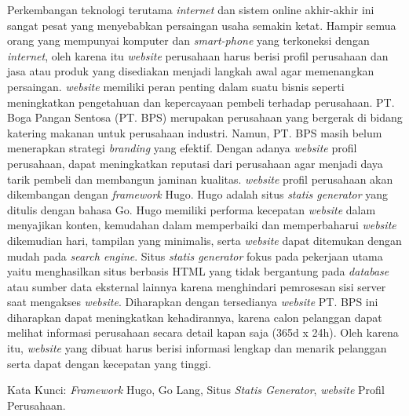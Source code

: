 
Perkembangan teknologi terutama \emph{internet} dan sistem online akhir-akhir ini sangat pesat 
yang menyebabkan persaingan usaha semakin ketat. Hampir semua orang yang mempunyai komputer 
dan \emph{smart-phone} yang terkoneksi dengan \emph{internet}, oleh karena itu \emph{website} perusahaan harus berisi 
profil perusahaan dan jasa atau produk yang disediakan menjadi langkah awal agar memenangkan persaingan. 
\emph{website} memiliki peran penting dalam suatu bisnis seperti meningkatkan pengetahuan dan kepercayaan pembeli 
terhadap perusahaan. PT. Boga Pangan Sentosa (PT. BPS) merupakan perusahaan yang bergerak di bidang katering 
makanan untuk perusahaan industri. Namun, PT. BPS masih belum menerapkan strategi \emph{branding} yang efektif. 
Dengan adanya \emph{website} profil perusahaan, dapat meningkatkan reputasi dari perusahaan agar menjadi daya tarik 
pembeli dan membangun jaminan kualitas. \emph{website} profil perusahaan akan dikembangan dengan \emph{framework} Hugo. 
Hugo adalah situs \emph{statis generator} yang ditulis dengan bahasa Go. Hugo memiliki performa kecepatan \emph{website} 
dalam menyajikan konten, kemudahan dalam memperbaiki dan memperbaharui \emph{website} dikemudian hari, tampilan yang 
minimalis, serta \emph{website} dapat ditemukan dengan mudah pada \emph{search engine}.  Situs \emph{statis generator} 
fokus pada 
pekerjaan utama yaitu menghasilkan situs berbasis HTML yang tidak bergantung pada \emph{database} atau sumber data 
eksternal lainnya karena menghindari pemrosesan sisi server saat mengakses \emph{website}. 
Diharapkan dengan tersedianya \emph{website} PT. BPS ini diharapkan dapat meningkatkan kehadirannya, 
karena calon pelanggan dapat melihat informasi perusahaan secara detail kapan saja (365d x 24h). 
Oleh karena itu, \emph{website} yang dibuat harus berisi informasi lengkap dan menarik pelanggan serta dapat 
dengan kecepatan yang tinggi. 

\noindent Kata Kunci: \emph{Framework} Hugo, Go Lang, Situs \emph{Statis Generator}, \emph{website} Profil Perusahaan.